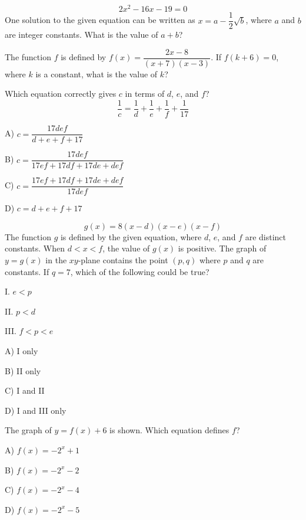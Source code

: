\vfill
\noindent\begin{minipage}{\linewidth}
\par\smallskip
$$2x^2-16x-19=0$$ One solution to the given equation can be written as $x=a-\dfrac{1}{2}\sqrt{b}$, where $a$ and $b$ are integer constants. What is the value of $a+b$?
\end{minipage}
\vfill
\clearpage
\noindent\begin{minipage}{\linewidth}
\par\smallskip
The function $f$ is defined by $f(x)=\dfrac{2x-8}{(x+7)(x-3)}$. If $f(k+6)=0$, where $k$ is a constant, what is the value of $k$?
\end{minipage}
\vfill
\noindent\begin{minipage}{\linewidth}
\par\smallskip
Which equation correctly gives $c$ in terms of $d$, $e$, and $f$? $$\frac{1}{c}=\frac{1}{d}+\frac{1}{e}+\frac{1}{f}+\frac{1}{17}$$
\begin{satchoices}
  \item[A)] $c=\dfrac{17def}{d+e+f+17}$
  \item[B)] $c=\dfrac{17def}{17ef+17df+17de+def}$
  \item[C)] $c=\dfrac{17ef+17df+17de+def}{17def}$
  \item[D)] $c=d+e+f+17$
\end{satchoices}
\end{minipage}
\vfill
\noindent\begin{minipage}{\linewidth}
\par\smallskip
$$g(x)=8(x-d)(x-e)(x-f)$$ The function $g$ is defined by the given equation, where $d$, $e$, and $f$ are distinct constants. When $d<x<f$, the value of $g(x)$ is positive. The graph of $y=g(x)$ in the $xy$-plane contains the point $(p,q)$ where $p$ and $q$ are constants. If $q=7$, which of the following could be true?\par\smallskip I. $e<p$\par II. $p<d$\par III. $f<p<e$
\begin{satchoices}
  \item[A)] I only
  \item[B)] II only
  \item[C)] I and II
  \item[D)] I and III only
\end{satchoices}
\end{minipage}
\vfill
\clearpage
\noindent\begin{minipage}{\linewidth}
\par\smallskip
The graph of $y=f(x)+6$ is shown. Which equation defines $f$?
\satfig{\figexpdecay}
\begin{satchoices}
  \item[A)] $f(x)=-2^x+1$
  \item[B)] $f(x)=-2^x-2$
  \item[C)] $f(x)=-2^x-4$
  \item[D)] $f(x)=-2^x-5$
\end{satchoices}
\end{minipage}
